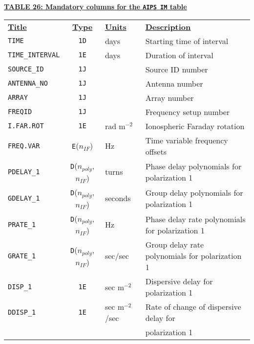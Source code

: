 \documentclass[twoside]{article}
\newcommand{\nif}{$n_{IF}$}
\newcommand{\npoly}{$n_{poly}$}
\begin{document}
\begin{center}
\underline{\bf{TABLE 26: Mandatory columns for the {\tt AIPS IM} table}}\\
\begin{tabular}{lcll}
\noalign{\vspace{2pt}} \label{ta:IMCOLS}
\underline{{\bf Title\vphantom{y}}} & \underline{\bf{Type}} &
   \underline{{\bf Units\vphantom{y}}} & \underline{\bf{Description}} \\
\noalign{\vspace{2pt}}
{\tt TIME}        & {\tt 1D} & days  & Starting time of interval \\
{\tt TIME\_INTERVAL} & {\tt 1E} & days & Duration of interval \\
{\tt SOURCE\_ID}  & {\tt 1J} &       & Source ID number \\
{\tt ANTENNA\_NO} & {\tt 1J} &       & Antenna number \\
{\tt ARRAY}       & {\tt 1J} &       & Array number \\
{\tt FREQID}      & {\tt 1J} &       & Frequency setup number \\
{\tt I.FAR.ROT}   & {\tt 1E} & rad m$^{-2}$ & Ionospheric Faraday
                                       rotation \\
{\tt FREQ.VAR}    & {\tt E}(\nif) & Hz & Time variable frequency
                                       offsets \\
{\tt PDELAY\_1}   & {\tt D}(\npoly,\nif) & turns & Phase delay
                                       polynomials for polarization 1 \\
{\tt GDELAY\_1}   & {\tt D}(\npoly,\nif) & seconds & Group delay
                                       polynomials for polarization 1 \\
{\tt PRATE\_1}    & {\tt D}(\npoly,\nif) & Hz & Phase delay rate
                                       polynomials for polarization 1 \\
{\tt GRATE\_1}    & {\tt D}(\npoly,\nif) & sec/sec & Group delay rate
                                       polynomials for polarization 1 \\
{\tt DISP\_1}     & {\tt 1E} & sec m$^{-2}$ & Dispersive delay for
                                       polarization 1 \\
{\tt DDISP\_1}    & {\tt 1E} & sec m$^{-2}$/sec & Rate of change of dispersive
                                       delay for \\
                  &          &         & \hspace{1em} polarization 1 \\

\end{tabular}
\end{center}
\end{document}
